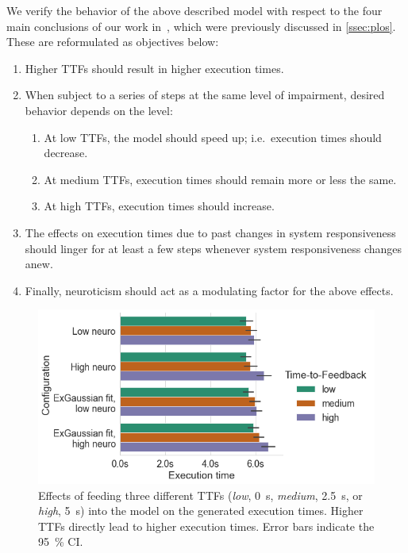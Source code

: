 We verify the behavior of the above described model with respect to the four main conclusions of our work in~\cite{olguinmunoz:impact2021}, which were previously discussed in \cref{ssec:plos}.
These are reformulated as objectives below:

\begin{enumerate}
    \item\label{it:ttftoexectime} Higher \acp{TTF} should result in higher execution times.
    \item\label{it:duration} When subject to a series of steps at the same level of impairment, desired behavior depends on the level:
    \begin{enumerate}
        \item At low \acp{TTF}, the model should speed up; i.e.\ execution times should decrease.
        \item At medium \acp{TTF}, execution times should remain more or less the same.
        \item At high \acp{TTF}, execution times should increase.
    \end{enumerate}
    \item The effects on execution times due to past changes in system responsiveness should linger for at least a few steps whenever system responsiveness changes anew.
    \item\label{it:neuro} Finally, neuroticism should act as a modulating factor for the above effects.
\end{enumerate}

\begin{figure}
    \centering
    \includegraphics[width=\columnwidth]{figs/new_model/ttf_to_exectime.png}
    \caption{%
        Effects of feeding three different \acp{TTF} (\emph{low}, \SI{0}{\second}, \emph{medium}, \SI{2.5}{\second}, or \emph{high}, \SI{5}{\second}) into the model on the generated execution times.
        Higher \acp{TTF} directly lead to higher execution times.
        Error bars indicate the \SI{95}{\percent} \ac{CI}.
    }\label{fig:ttf_to_exectime}
\end{figure}


